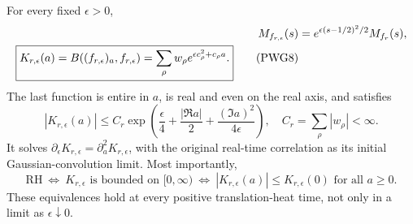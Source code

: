 \begin{theorem}
For every fixed $\epsilon>0$,
\begin{align}
 M_{f_{r,\epsilon}}(s)&=e^{\epsilon(s-1/2)^2/2}M_{f_r}(s),\notag\\
 \boxed{K_{r,\epsilon}(a)=
 B((f_{r,\epsilon})_a,f_{r,\epsilon})
 =\sum_\rho w_\rho e^{\epsilon c_\rho^2+c_\rho a}.}          \tag{PWG8}\label{PWG8}
\end{align}
The last function is entire in $a$, is real and even on the real axis, and satisfies
\begin{equation}
 |K_{r,\epsilon}(a)|\le C_r
 \exp\left(\frac\epsilon4+\frac{|\Re a|}{2}
                         +\frac{(\Im a)^2}{4\epsilon}\right),
 \quad C_r=\sum_\rho|w_\rho|<\infty.                        \tag{PWG9}\label{PWG9}
\end{equation}
It solves $\partial_\epsilon K_{r,\epsilon}=\partial_a^2K_{r,\epsilon}$, with the original real-time correlation as its initial Gaussian-convolution limit. Most importantly,
\begin{equation}
 \boxed{\mathrm{RH}\ \Longleftrightarrow\
 K_{r,\epsilon}\text{ is bounded on }[0,\infty)
 \ \Longleftrightarrow\ |K_{r,\epsilon}(a)|\le K_{r,\epsilon}(0)
                    \text{ for all }a\ge0.}                \tag{PWG10}\label{PWG10}
\end{equation}
These equivalences hold at every positive translation-heat time, not only in a limit as $\epsilon\downarrow0$.
\end{theorem}
